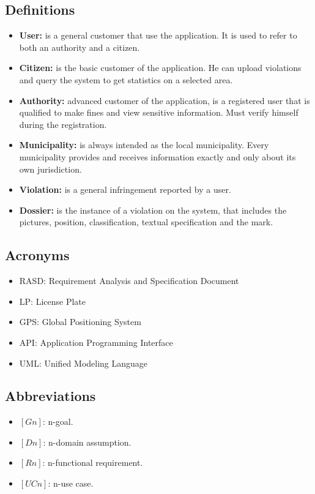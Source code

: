 \documentclass[../RASD.tex]{subfiles}
\begin{document}
    \subsection{Definitions}\label{subsec:definitions}
    \begin{itemize}
        \item \textbf{User:} is a general customer that use the application.
        It is used to refer to both an authority and a citizen.
        \item \textbf{Citizen:} is the basic customer of the application.
        He can upload violations and query the system to get statistics on a selected area.
        \item \textbf{Authority:} advanced customer of the application, is a registered user that is qualified to make fines and view sensitive information.
        Must verify himself during the registration.
        \item \textbf{Municipality:} is always intended as the local municipality.
        Every municipality provides and receives information exactly and only about its own jurisdiction.
        \item \textbf{Violation:} is a general infringement reported by a user.
        \item  \textbf{Dossier:} is the instance of a violation on the system, that includes the pictures, position, classification, textual specification and the mark.
    \end{itemize}

    \subsection{Acronyms}\label{subsec:acronyms}
    \begin{itemize}
        \item RASD: Requirement Analysis and Specification Document
        \item LP: License Plate
        \item GPS: Global Positioning System
        \item API: Application Programming Interface
        \item UML: Unified Modeling Language
    \end{itemize}

    \subsection{Abbreviations}\label{subsec:abbreviations}
    \begin{itemize}
        \item $[Gn]$: n-goal.
        \item $[Dn]$: n-domain assumption.
        \item $[Rn]$: n-functional requirement.
        \item $[UCn]$: n-use case.
    \end{itemize}
    \newpage
\end{document}

